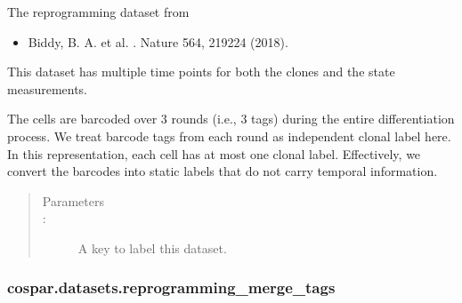 \documentclass[letterpaper,10pt,english]{sphinxmanual}
\begin{document}
\begin{fulllineitems}
\label{\detokenize{cospar.datasets.reprogramming_no_merge_tags:cospar.datasets.reprogramming_no_merge_tags}}
The reprogramming dataset from
\begin{itemize}
\item {} 
Biddy, B. A. et al. . Nature 564, 219\textendash{}224 (2018).

\end{itemize}

This dataset has multiple time points for both the clones and the state measurements.

The cells are barcoded over 3 rounds (i.e., 3 tags) during the entire differentiation
process. We treat barcode tags from each round as independent clonal label here.
In this representation, each cell has at most one clonal label. Effectively,
we convert the barcodes into static labels that do not carry temporal information.
\begin{quote}\begin{description}
\item[{Parameters}] \leavevmode\item[{ : }] \leavevmode
A key to label this dataset.


\end{description}\end{quote}

\end{fulllineitems}



\subsubsection{cospar.datasets.reprogramming\_merge\_tags}
\label{\detokenize{cospar.datasets.reprogramming_merge_tags:cospar-datasets-reprogramming-merge-tags}}\label{\detokenize{cospar.datasets.reprogramming_merge_tags::doc}}
\end{document}
